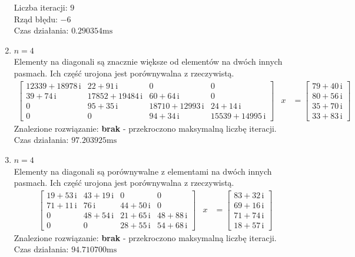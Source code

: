 \documentclass[12pt]{article}
\begin{document}
\begin{enumerate}[label=\textbf{Układ \arabic*}]
			Liczba iteracji: $9$\\
			Rząd błędu: $-6$\\
			Czas działania: $0.290354\text{ms}$
		
		\item
			$n = 4$\\
			Elementy na diagonali są znacznie większe od elementów na dwóch innych pasmach. Ich część urojona jest porównywalna z rzeczywistą.
			{\small
			\begin{align*}
				\left[
					\begin{array}{cccc} 12339 + 18978\, \mathrm{i} & 22 + 91\, \mathrm{i} & 0 & 0\\ 39 + 74\, \mathrm{i} & 17852 + 19484\, \mathrm{i} & 60 + 64\, \mathrm{i} & 0\\ 0 & 95 + 35\, \mathrm{i} & 18710 + 12993\, \mathrm{i} & 24 + 14\, \mathrm{i}\\ 0 & 0 & 94 + 34\, \mathrm{i} & 15539 + 14995\, \mathrm{i} \end{array}
				\right]
				&x
				&=
				\left[
					\begin{array}{c} 79 + 40\, \mathrm{i}\\ 80 + 56\, \mathrm{i}\\ 35 + 70\, \mathrm{i}\\ 33 + 83\, \mathrm{i} \end{array}
				\right]
			\end{align*}
			}%
			Znalezione rozwiązanie: \textbf{brak} - przekroczono maksymalną liczbę iteracji.\\
			Czas działania: $97.203925\text{ms}$
		
		\item
			$n = 4$\\
			Elementy na diagonali są porównywalne z elementami na dwóch innych pasmach. Ich część urojona jest porównywalna z rzeczywistą.
			\begin{align*}
				\left[
					\begin{array}{cccc} 19 + 53\, \mathrm{i} & 43 + 19\, \mathrm{i} & 0 & 0\\ 71 + 11\, \mathrm{i} & 76\, \mathrm{i} & 44 + 50\, \mathrm{i} & 0\\ 0 & 48 + 54\, \mathrm{i} & 21 + 65\, \mathrm{i} & 48 + 88\, \mathrm{i}\\ 0 & 0 & 28 + 55\, \mathrm{i} & 54 + 68\, \mathrm{i} \end{array}
				\right]
				&x
				&=
				\left[
					\begin{array}{c} 83 + 32\, \mathrm{i}\\ 69 + 16\, \mathrm{i}\\ 71 + 74\, \mathrm{i}\\ 18 + 57\, \mathrm{i} \end{array}
				\right]
			\end{align*}
			Znalezione rozwiązanie: \textbf{brak} - przekroczono maksymalną liczbę iteracji.\\
			Czas działania: $94.710700\text{ms}$
		

\end{enumerate}
\end{document}
